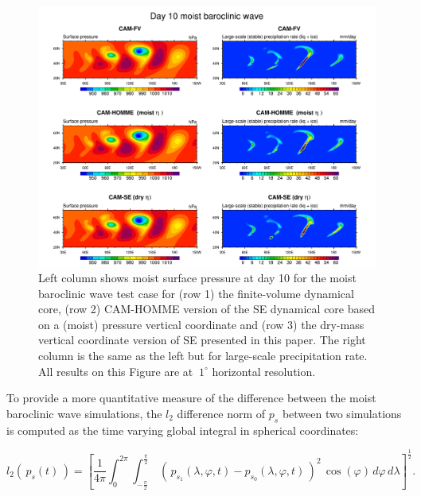\documentclass{agujournal}
\begin{document}
\begin{figure}[h]
\centering
\includegraphics[width=33pc]{figs/02_baro_wave.pdf}
\caption{Left column shows moist surface pressure at day 10 for the moist baroclinic wave test case for (row 1) the finite-volume dynamical core, (row 2) CAM-HOMME version of the SE dynamical core based on a (moist) pressure vertical coordinate and (row 3) the dry-mass vertical coordinate version of SE presented in this paper. The right column is the same as the left but for large-scale precipitation rate. All results on this Figure are at $~1^\circ$ horizontal resolution.}
\label{fig:baro_wave}
\end{figure}

To provide a more quantitative measure of the difference between the moist baroclinic wave simulations, the $l_2$ difference norm of $p_s$ between two simulations is computed as the time varying global integral in spherical coordinates:

\begin{equation}
l_2\left(\,p_s(t)\,\right) = \left[ \frac{1}{4\pi}\int^{2\pi}_{0} \int^{\frac{\pi}{2}}_{-\frac{\pi}{2}} \ \left(\,p_{s_1}(\lambda,\varphi,t) - p_{s_0}(\lambda,\varphi,t)\,\right)^2 \, \cos(\varphi) \, d\varphi \, d\lambda \right]^\frac{1}{2}.
\end{equation}
\end{document}
